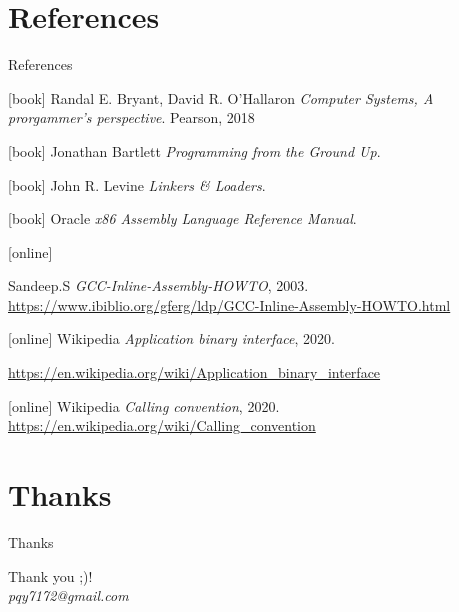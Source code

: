 \documentclass[UKenglish]{beamer}
\begin{document}
\section{References}
\begin{frame}[allowframebreaks]{References}
    \begin{thebibliography}{}

        [book]
         Randal E. Bryant, David R. O'Hallaron
        \newblock \emph{Computer Systems, A prorgammer's perspective}.
        \newblock Pearson, 2018
   

      [book]
          Jonathan Bartlett
        \newblock \emph{Programming from the Ground Up}.

        [book]
          John R. Levine
        \newblock \emph{Linkers \& Loaders}.

        [book]
         Oracle
        \newblock \emph{x86 Assembly Language Reference Manual}.
        
        [online]
        
          Sandeep.S
        \newblock \emph{GCC-Inline-Assembly-HOWTO}, 2003.
        \newblock \url{https://www.ibiblio.org/gferg/ldp/GCC-Inline-Assembly-HOWTO.html}

        [online]
        Wikipedia
        \newblock \emph{Application binary interface}, 2020.
        
        \newblock \url{https://en.wikipedia.org/wiki/Application_binary_interface}

        [online]
        Wikipedia
        \newblock \emph{Calling convention}, 2020.
        \newblock \url{https://en.wikipedia.org/wiki/Calling_convention}
      \end{thebibliography}
    \end{frame}
    
 \section{Thanks}

 \begin{frame}{Thanks}
   \begin{center}
     \vspace{2cm}
     \Huge Thank you ;)!\\
     
     \emph{pqy7172@gmail.com}
   \end{center}
 \end{frame}
\end{document}
